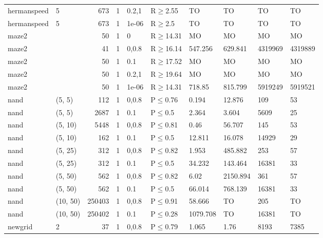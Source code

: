 \begin{longtable}{llrrllllll}
 hermanspeed   & 5        &    	673 & 1 & 0.2,1 & R$\geq$2.55  & TO       & TO       & TO      & TO      \\
 hermanspeed   & 5        &    	673 & 1 & 1e-06 & R$\geq$2.5   & TO       & TO       & TO      & TO      \\
 maze2         &          &     	50 & 1 & 0     & R$\geq$14.31 & MO       & MO       & MO      & MO      \\
 maze2         &          &     	41 & 1 & 0,0.8 & R$\geq$16.14 & 547.256  & 629.841  & 4319969 & 4319889 \\
 maze2         &          &     	50 & 1 & 0.1   & R$\geq$17.52 & MO       & MO       & MO      & MO      \\
 maze2         &          &     	50 & 1 & 0.2,1 & R$\geq$19.64 & MO       & MO       & MO      & MO      \\
 maze2         &          &     	50 & 1 & 1e-06 & R$\geq$14.31 & 718.85   & 815.799  & 5919249 & 5919521 \\
 nand          & (5, 5)   &    	112 & 1 & 0,0.8 & P$\leq$0.76  & 0.194    & 12.876   & 109     & 53      \\
 nand          & (5, 5)   &   	2687 & 1 & 0.1   & P$\leq$0.5   & 2.364    & 3.604    & 5609    & 25      \\
 nand          & (5, 10)  &   	5448 & 1 & 0,0.8 & P$\leq$0.81  & 0.46     & 56.707   & 145     & 53      \\
 nand          & (5, 10)  &    	162 & 1 & 0.1   & P$\leq$0.5   & 12.811   & 16.078   & 14929   & 29      \\
 nand          & (5, 25)  &    	312 & 1 & 0,0.8 & P$\leq$0.82  & 1.953    & 485.882  & 253     & 57      \\
 nand          & (5, 25)  &    	312 & 1 & 0.1   & P$\leq$0.5   & 34.232   & 143.464  & 16381   & 33      \\
 nand          & (5, 50)  &    	562 & 1 & 0,0.8 & P$\leq$0.82  & 6.02     & 2150.894 & 361     & 57      \\
 nand          & (5, 50)  &    	562 & 1 & 0.1   & P$\leq$0.5   & 66.014   & 768.139  & 16381   & 33      \\
 nand          & (10, 50) & 	250403 & 1 & 0,0.8 & P$\leq$0.91  & 58.666   & TO       & 205     & TO      \\
 nand          & (10, 50) & 	250402 & 1 & 0.1   & P$\leq$0.28  & 1079.708 & TO       & 16381   & TO      \\
 newgrid       & 2        &     	37 & 1 & 0,0.8 & P$\leq$0.79  & 1.065    & 1.76     & 8193    & 7385    \\

\end{longtable}
